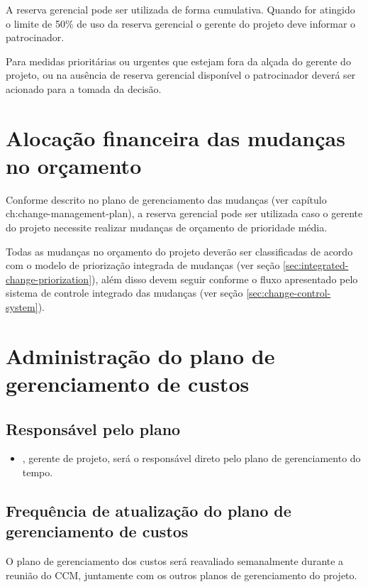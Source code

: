 A reserva gerencial pode ser utilizada de forma cumulativa. Quando for atingido o limite de 50\% de uso da reserva gerencial o gerente do projeto deve informar o patrocinador.

Para medidas prioritárias ou urgentes que estejam fora da alçada do gerente do projeto, ou na ausência de reserva gerencial disponível o patrocinador deverá ser acionado para a tomada da decisão.

\section{Alocação financeira das mudanças no orçamento}

Conforme descrito no plano de gerenciamento das mudanças (ver capítulo ch:change-management-plan), a reserva gerencial pode ser utilizada caso o gerente do projeto necessite realizar mudanças de orçamento de prioridade média.

Todas as mudanças no orçamento do projeto deverão ser classificadas de acordo com o modelo de priorização integrada de mudanças (ver seção \ref{sec:integrated-change-priorization}), além disso devem seguir conforme o fluxo apresentado pelo sistema de controle integrado das mudanças (ver seção \ref{sec:change-control-system}).

\section{Administração do plano de gerenciamento de custos}

\subsection{Responsável pelo plano}

\begin{itemize}
	\item \projectManagerName{}, gerente de projeto, será o responsável direto pelo plano de gerenciamento do tempo.
\end{itemize}

\subsection{Frequência de atualização do plano de gerenciamento de custos}

O plano de gerenciamento dos custos será reavaliado semanalmente durante a reunião do CCM, juntamente com os outros planos de gerenciamento do projeto.

